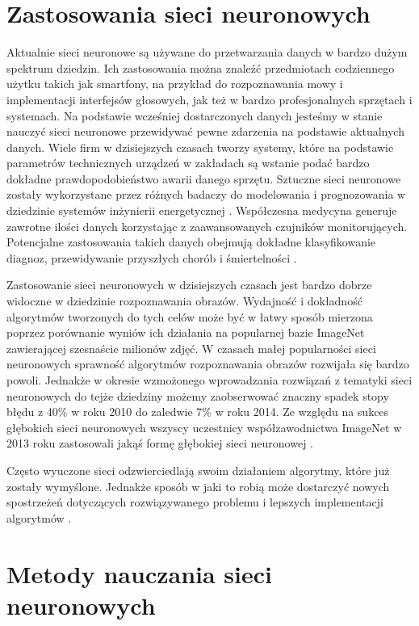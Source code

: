 \documentclass[12pt, oneside, a4paper]{report}
\begin{document}
\section{Zastosowania sieci neuronowych}

Aktualnie sieci neuronowe są używane do przetwarzania danych w bardzo dużym spektrum dziedzin. Ich zastosowania można znaleźć przedmiotach codziennego użytku takich jak smartfony, na przykład do rozpoznawania mowy i implementacji interfejsów głosowych, jak też w bardzo profesjonalnych sprzętach i systemach. Na podstawie wcześniej dostarczonych danych jesteśmy w stanie nauczyć sieci neuronowe przewidywać pewne zdarzenia na podstawie aktualnych danych. Wiele firm w dzisiejszych czasach tworzy systemy, które na podstawie parametrów technicznych urządzeń w zakładach są wstanie podać bardzo dokładne prawdopodobieństwo awarii danego sprzętu. Sztuczne sieci neuronowe zostały wykorzystane przez różnych badaczy do modelowania i prognozowania w dziedzinie systemów inżynierii energetycznej \citep{kalogirou2000applications}. Współczesna medycyna generuje zawrotne ilości danych korzystając z zaawansowanych czujników monitorujących. Potencjalne zastosowania takich danych obejmują dokładne klasyfikowanie diagnoz, przewidywanie przyszłych chorób i śmiertelności \citep{lipton2015learning}.

Zastosowanie sieci neuronowych w dzisiejszych czasach jest bardzo dobrze widoczne w dziedzinie rozpoznawania obrazów. Wydajność i dokładność algorytmów tworzonych do tych celów może być w łatwy sposób mierzona poprzez porównanie wyniów ich działania na popularnej bazie ImageNet \citep{image-net} zawierającej szesnaście milionów zdjęć. W czasach małej popularności sieci neuronowych sprawność algorytmów rozpoznawania obrazów rozwijała się bardzo powoli. Jednakże w okresie wzmożonego wprowadzania rozwiązań z tematyki sieci neuronowych do tejże dziedziny możemy zaobserwować znaczny spadek stopy błędu z 40\% w roku 2010 do zaledwie 7\% w roku 2014. Ze względu na sukces głębokich sieci neuronowych wszyscy uczestnicy współzawodnictwa ImageNet w 2013 roku zastosowali jakąś formę głębokiej sieci neuronowej \citep{roelants2017deeplearning}.

Często wyuczone sieci odzwierciedlają swoim działaniem algorytmy, które już zostały wymyślone. Jednakże sposób w jaki to robią może dostarczyć nowych spostrzeżeń dotyczących rozwiązywanego problemu i lepszych implementacji algorytmów \citep{murray1995applications}.


\section{Metody nauczania sieci neuronowych}
\end{document}
